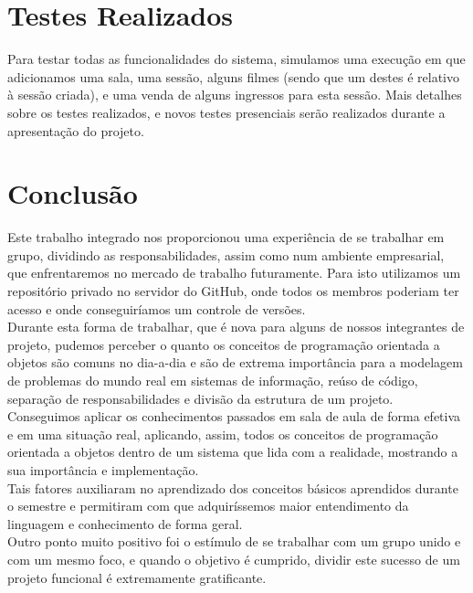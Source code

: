 \documentclass[a4paper]{article}
\begin{document}
\pagebreak

\section{Testes Realizados}
\hspace{5 mm}Para testar todas as funcionalidades do sistema, simulamos uma execução em que adicionamos uma sala, uma sessão, alguns filmes (sendo que um destes é relativo à sessão criada), e uma venda de alguns ingressos para esta sessão. Mais detalhes sobre os testes realizados, e novos testes presenciais serão realizados durante a apresentação do projeto.

\pagebreak

\section{Conclusão}
\hspace{5 mm}Este trabalho integrado nos proporcionou uma experiência de se trabalhar em grupo, dividindo as responsabilidades, assim como num ambiente empresarial, que enfrentaremos no mercado de trabalho futuramente. Para isto utilizamos um repositório privado no servidor do GitHub, onde todos os membros poderiam ter acesso e onde conseguiríamos um controle de versões.\\

Durante esta forma de trabalhar, que é nova para alguns de nossos integrantes de projeto, pudemos perceber o quanto os conceitos de programação orientada a objetos são comuns no dia-a-dia e são de extrema importância para a modelagem de problemas do mundo real em sistemas de informação, reúso de código, separação de responsabilidades e divisão da estrutura de um projeto.\\

Conseguimos aplicar os conhecimentos passados em sala de aula de forma efetiva e em uma situação real, aplicando, assim, todos os conceitos de programação orientada a objetos dentro de um sistema que lida com a realidade, mostrando a sua importância e implementação.\\

Tais fatores auxiliaram no aprendizado dos conceitos básicos aprendidos durante o semestre e permitiram com que adquiríssemos maior entendimento da linguagem e conhecimento de forma geral.\\

Outro ponto muito positivo foi o estímulo de se trabalhar com um grupo unido e com um mesmo foco, e quando o objetivo é cumprido, dividir este sucesso de um projeto funcional é extremamente gratificante.
\end{document}
